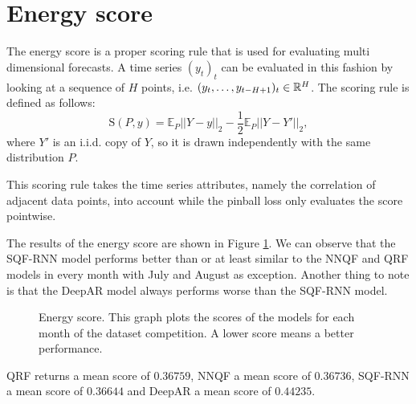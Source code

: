\section{Energy score}

The energy score is a proper scoring rule that is used for 
evaluating multi dimensional forecasts. A time series \((y_t)_t\) 
can be evaluated in this fashion by looking at a sequence of \(H\) 
points, i.e. \((y_t, \ldots, y_{t-H+1})_t \in \mathbb{R}^H\). 
The scoring rule is defined as follows:
\[ \mathrm{S}(P, y) = \mathbb{E}_P ||Y-y||_2 - \frac{1}{2} \mathbb{E}_P ||Y-Y'||_2, \]
where \(Y'\) is an i.i.d. copy of \(Y\), so it is drawn independently with the same distribution \(P\).

This scoring rule takes the time series attributes, namely the 
correlation of adjacent data points, into account while 
the pinball loss only evaluates the score pointwise.

The results of the energy score are shown in Figure \ref{fig:energy-score}. 
We can observe that the SQF-RNN model performs better than or at least similar 
to the NNQF and QRF models in every month with July and August as exception. 
Another thing to note is that the DeepAR model always performs worse than the SQF-RNN model. 

\begin{figure}[ht]
    \centering
    
    \caption[Energy score]{Energy score. 
    This graph plots the scores of the models for each month of the dataset competition. A lower score means a better performance.}
    \label{fig:energy-score}
\end{figure}

QRF returns a mean score of \(0.36759\), NNQF a mean score of \(0.36736\), 
SQF-RNN a mean score of \(0.36644\) and DeepAR a mean score of \(0.44235\).